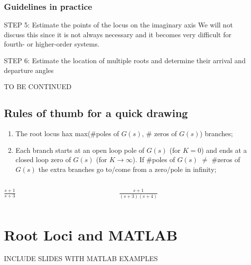 \begin{frame}
\frametitle{Guidelines in practice}	
	\begin{block}{STEP 5: Estimate the points of the locus on the imaginary axis}
		We will not discuss this since it is not always necessary and it becomes very difficult for fourth- or higher-order systems.
	\end{block}
	
	\begin{block}{STEP 6: Estimate the location of multiple roots and determine their arrival and departure angles}
		
	\end{block}
	
	TO BE CONTINUED
\end{frame}

\subsection{Rules of thumb for a quick drawing}

\begin{frame}
	\begin{enumerate}
		\item The root locus hax max($\#$poles of $G(s)$, $\#$ zeros of $G(s)$) branches;
		\item Each branch starts at an open loop pole of $G(s)$ (for $K=0$) and ends at a closed loop zero of $G(s)$ (for $K \rightarrow \infty$). If $\#$poles of $G(s)$ $\neq$ $\#$zeros of $G(s)$ the extra branches go to/come from a zero/pole in infinity;
	\end{enumerate}
	
	\begin{columns}
		\begin{column}{0.5\textwidth}
			$\frac{s +1}{s+3}$
		\end{column}
		\begin{column}{0.5\textwidth}
			$\frac{s + 1}{(s + 3)(s + 4)}$
		\end{column}
	\end{columns}
	
\end{frame}

\section{Root Loci and MATLAB}

\begin{frame}
	INCLUDE SLIDES WITH MATLAB EXAMPLES
\end{frame}